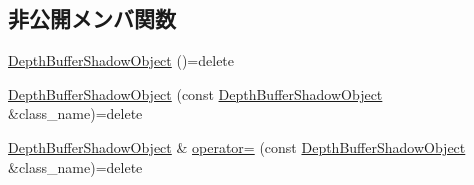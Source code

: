 \subsection*{非公開メンバ関数}
\begin{DoxyCompactItemize}
\item 
\mbox{\hyperlink{class_depth_buffer_shadow_object_a2c23801a681ac79e2f9633f568634b81}{Depth\+Buffer\+Shadow\+Object}} ()=delete
\item 
\mbox{\hyperlink{class_depth_buffer_shadow_object_af144bdc29aabd1a84e789e3788d0a9a8}{Depth\+Buffer\+Shadow\+Object}} (const \mbox{\hyperlink{class_depth_buffer_shadow_object}{Depth\+Buffer\+Shadow\+Object}} \&class\+\_\+name)=delete
\item 
\mbox{\hyperlink{class_depth_buffer_shadow_object}{Depth\+Buffer\+Shadow\+Object}} \& \mbox{\hyperlink{class_depth_buffer_shadow_object_a00d8b986d4f2c1d82dd836c0f5ce3751}{operator=}} (const \mbox{\hyperlink{class_depth_buffer_shadow_object}{Depth\+Buffer\+Shadow\+Object}} \&class\+\_\+name)=delete
\end{DoxyCompactItemize}
